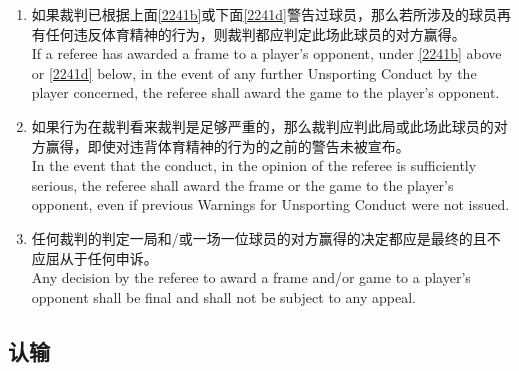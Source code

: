\begin{enumerate}[label=(\alph*)]
    \item \label{2241c}如果裁判已根据上面\ref{2241b}或下面\ref{2241d}警告过球员，那么若所涉及的球员再有任何违反体育精神的行为，则裁判都应判定此场此球员的对方赢得。\\
    If a referee has awarded a frame to a player's opponent, under \ref{2241b} above or \ref{2241d} below, in the event of any further Unsporting Conduct by the player concerned, the referee shall award the game to the player's opponent.
    \item \label{2241d}如果行为在裁判看来裁判是足够严重的，那么裁判应判此局或此场此球员的对方赢得，即使对违背体育精神的行为的之前的警告未被宣布。\\
    In the event that the conduct, in the opinion of the referee is sufficiently serious, the referee shall award the frame or the game to the player's opponent, even if previous Warnings for Unsporting Conduct were not issued.
    \item 任何裁判的判定一局和/或一场一位球员的对方赢得的决定都应是最终的且不应屈从于任何申诉。 \\
    Any decision by the referee to award a frame and/or game to a player's opponent shall be final and shall not be subject to any appeal.
\end{enumerate}

\subsection{认输}\label{2242}


